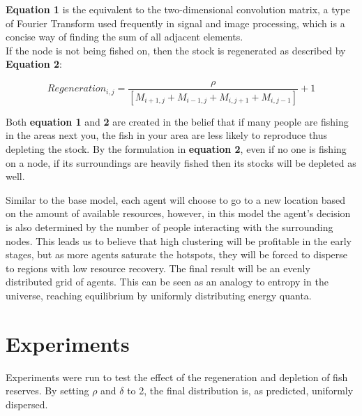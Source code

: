 \documentclass{article}
\begin{document}
{\bf Equation 1} is the equivalent to the two-dimensional convolution matrix, a type of Fourier Transform used frequently in signal and image processing, which is a concise way of finding the sum of all adjacent elements. \\
If the node is not being fished on, then the stock is regenerated as described by {\bf Equation 2}: 

\begin{equation}
	Regeneration_{i,j} = \frac{\rho}{[M_{i+1, j} + M_{i-1, j} + M_{i, j+1} + M_{i, j-1}]} + 1
\end{equation}

Both {\bf equation 1} and {\bf 2} are created in the belief that if many people are fishing in the areas next you, the fish in your area are less likely to reproduce thus depleting the stock. By the formulation in {\bf equation 2}, even if no one is fishing on a node, if its surroundings are heavily fished then its stocks will be depleted as well. \*

Similar to the base model, each agent will choose to go to a new location based on the amount of available resources, however, in this model the agent's decision is also determined by the number of people interacting with the surrounding nodes. This leads us to believe that high clustering will be profitable in the early stages, but as more agents saturate the hotspots, they will be forced to disperse to regions with low resource recovery. The final result will be an evenly distributed grid of agents. This can be seen as an analogy to entropy in the universe, reaching equilibrium by uniformly distributing energy quanta.

\section{Experiments} 
Experiments were run to test the effect of the regeneration and depletion of fish reserves. By setting $\rho$ and $\delta$ to 2, the final distribution is, as predicted, uniformly dispersed. 
\end{document}
